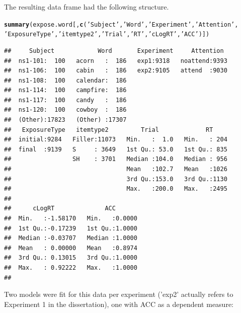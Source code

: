 \documentclass[11pt]{article}\usepackage[]{graphicx}\usepackage[]{color}
\makeatletter
\newcommand{\hlstr}[1]{\textcolor[rgb]{0.192,0.494,0.8}{#1}}%
\newcommand{\hlstd}[1]{\textcolor[rgb]{0.345,0.345,0.345}{#1}}%
\newcommand{\hlkwd}[1]{\textcolor[rgb]{0.737,0.353,0.396}{\textbf{#1}}}%
\newenvironment{kframe}{%
 \def\at@end@of@kframe{}%
 \ifinner\ifhmode%
  \def\at@end@of@kframe{\end{minipage}}%
  \begin{minipage}{\columnwidth}%
 \fi\fi%
 \def\FrameCommand##1{\hskip\@totalleftmargin \hskip-\fboxsep
 \colorbox{shadecolor}{##1}\hskip-\fboxsep
     \hskip-\linewidth \hskip-\@totalleftmargin \hskip\columnwidth}%
 \MakeFramed {\advance\hsize-\width
   \@totalleftmargin\z@ \linewidth\hsize
   \@setminipage}}%
 {\par\unskip\endMakeFramed%
 \at@end@of@kframe}
\newenvironment{knitrout}{}{} %
\makeatother
\begin{document}
The resulting data frame had the following structure.

\begin{knitrout}\footnotesize
{}\color{fgcolor}\begin{kframe}
\begin{alltt}
 \hlkwd{summary}\hlstd{(expose.word[,}\hlkwd{c}\hlstd{(}\hlstr{'Subject'}\hlstd{,} \hlstr{'Word'}\hlstd{,} \hlstr{'Experiment'}\hlstd{,} \hlstr{'Attention'}\hlstd{,}
 \hlstr{'ExposureType'}\hlstd{,} \hlstr{'itemtype2'}\hlstd{,} \hlstr{'Trial'}\hlstd{,} \hlstr{'RT'}\hlstd{,} \hlstr{'cLogRT'}\hlstd{,} \hlstr{'ACC'}\hlstd{)])}
\end{alltt}
\begin{verbatim}
##     Subject            Word       Experiment     Attention   
##  ns1-101:  100   acorn   :  186   exp1:9318   noattend:9393  
##  ns1-106:  100   cabin   :  186   exp2:9105   attend  :9030  
##  ns1-108:  100   calendar:  186                              
##  ns1-114:  100   campfire:  186                              
##  ns1-117:  100   candy   :  186                              
##  ns1-120:  100   cowboy  :  186                              
##  (Other):17823   (Other) :17307                              
##   ExposureType   itemtype2         Trial             RT      
##  initial:9284   Filler:11073   Min.   :  1.0   Min.   : 204  
##  final  :9139   S     : 3649   1st Qu.: 53.0   1st Qu.: 835  
##                 SH    : 3701   Median :104.0   Median : 956  
##                                Mean   :102.7   Mean   :1026  
##                                3rd Qu.:153.0   3rd Qu.:1130  
##                                Max.   :200.0   Max.   :2495  
##                                                              
##      cLogRT              ACC        
##  Min.   :-1.58170   Min.   :0.0000  
##  1st Qu.:-0.17239   1st Qu.:1.0000  
##  Median :-0.03707   Median :1.0000  
##  Mean   : 0.00000   Mean   :0.8974  
##  3rd Qu.: 0.13015   3rd Qu.:1.0000  
##  Max.   : 0.92222   Max.   :1.0000  
## 
\end{verbatim}
\end{kframe}
\end{knitrout}

Two models were fit for this data per experiment ('exp2' actually refers to Experiment 1 in the dissertation), one with ACC as a dependent measure:
\end{document}
